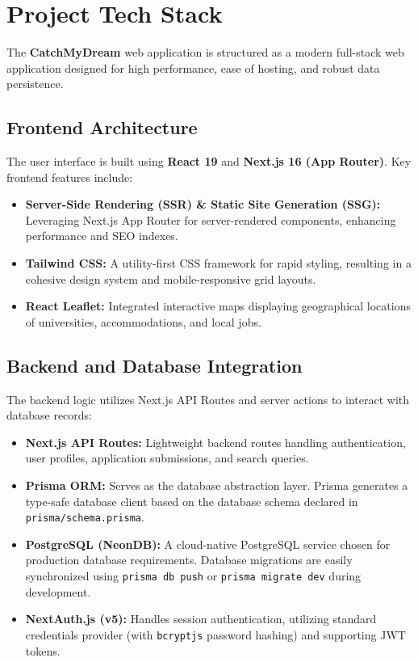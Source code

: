 \documentclass[12pt,a4paper]{article}
\begin{document}
\clearpage

\section{Project Tech Stack}

The \textbf{CatchMyDream} web application is structured as a modern full-stack web application designed for high performance, ease of hosting, and robust data persistence. 

\subsection{Frontend Architecture}
The user interface is built using \textbf{React 19} and \textbf{Next.js 16 (App Router)}. Key frontend features include:
\begin{itemize}
    \item \textbf{Server-Side Rendering (SSR) \& Static Site Generation (SSG):} Leveraging Next.js App Router for server-rendered components, enhancing performance and SEO indexes.
    \item \textbf{Tailwind CSS:} A utility-first CSS framework for rapid styling, resulting in a cohesive design system and mobile-responsive grid layouts.
    \item \textbf{React Leaflet:} Integrated interactive maps displaying geographical locations of universities, accommodations, and local jobs.
\end{itemize}

\subsection{Backend and Database Integration}
The backend logic utilizes Next.js API Routes and server actions to interact with database records:
\begin{itemize}
    \item \textbf{Next.js API Routes:} Lightweight backend routes handling authentication, user profiles, application submissions, and search queries.
    \item \textbf{Prisma ORM:} Serves as the database abstraction layer. Prisma generates a type-safe database client based on the database schema declared in \texttt{prisma/schema.prisma}.
    \item \textbf{PostgreSQL (NeonDB):} A cloud-native PostgreSQL service chosen for production database requirements. Database migrations are easily synchronized using \texttt{prisma db push} or \texttt{prisma migrate dev} during development.
    \item \textbf{NextAuth.js (v5):} Handles session authentication, utilizing standard credentials provider (with \texttt{bcryptjs} password hashing) and supporting JWT tokens.
\end{itemize}
\end{document}
